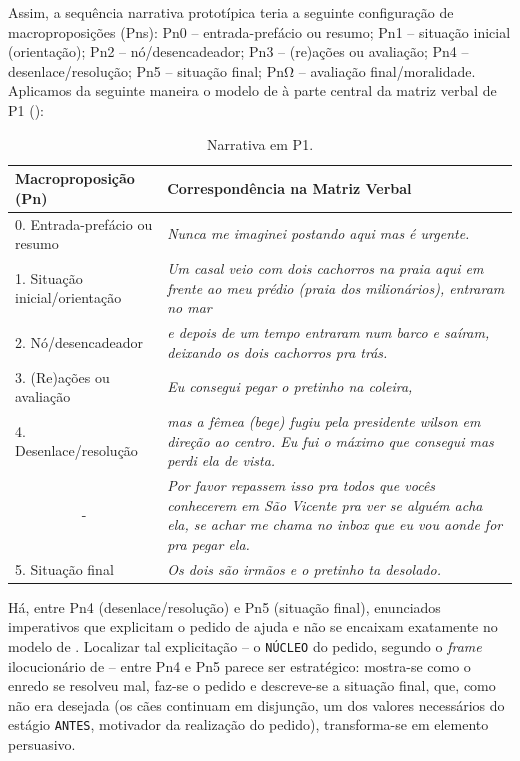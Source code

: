 \documentclass{textolivre}
\begin{document}
Assim, a sequência narrativa prototípica teria a seguinte configuração de macroproposições (Pns): Pn0 – entrada-prefácio ou resumo; Pn1 – situação inicial (orientação); Pn2 – nó/desencadeador; Pn3 – (re)ações ou avaliação; Pn4 – desenlace/resolução; Pn5 – situação final; PnΩ – avaliação final/moralidade.
Aplicamos da seguinte maneira o modelo de \textcite{adam1992} à parte central da matriz verbal de P1 ():

\begin{table}[htpb]
\caption{Narrativa em P1.}
\label{tbl-tabela-01}
\begin{tabular}{lp{}}
\toprule
Macroproposição (Pn) & Correspondência na Matriz Verbal\\
\midrule
0. Entrada-prefácio ou resumo  & \textit{Nunca me imaginei postando aqui mas é urgente.}\\
1. Situação inicial/orientação & \textit{Um casal veio com dois cachorros na praia aqui em frente ao meu prédio (praia dos milionários), entraram no mar}\\
2. Nó/desencadeador            & \textit{e depois de um tempo entraram num barco e saíram, deixando os dois cachorros pra trás.}\\
3. (Re)ações ou avaliação      & \textit{Eu consegui pegar o pretinho na coleira,}\\
4. Desenlace/resolução         & \textit{mas a fêmea (bege) fugiu pela presidente wilson em direção ao centro. Eu fui o máximo que consegui mas perdi ela de vista.}\\
\multicolumn{1}{c}{-}          & \textit{Por favor repassem isso pra todos que vocês conhecerem em São Vicente pra ver se alguém acha ela, se achar me chama no inbox que eu vou aonde for pra pegar ela.} \\
5. Situação final              & \textit{Os dois são irmãos e o pretinho ta desolado.} \\
\bottomrule
\end{tabular}
\end{table}

Há, entre Pn4 (desenlace/resolução) e Pn5 (situação final), enunciados imperativos que explicitam o pedido de ajuda e não se encaixam exatamente no modelo de \textcite{adam1992}. Localizar tal explicitação – o \texttt{NÚCLEO} do pedido, segundo o \textit{frame} ilocucionário de \textcite{panther2017} -- entre Pn4 e Pn5 parece ser estratégico: mostra-se como o enredo se resolveu mal, faz-se o pedido e descreve-se a situação final, que, como não era desejada (os cães continuam em disjunção, um dos valores necessários do estágio \texttt{ANTES}, motivador da realização do pedido), transforma-se em elemento persuasivo.
\end{document}

